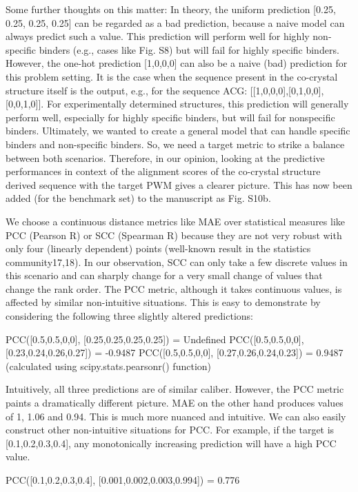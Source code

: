 Some further thoughts on this matter: In theory, the uniform prediction [0.25, 0.25, 0.25, 0.25] can be regarded as a bad prediction, because a naive model can always predict such a value. This prediction will perform well for highly non-specific binders (e.g., cases like Fig. S8) but will fail for highly specific binders. However, the one-hot prediction [1,0,0,0] can also be a naive (bad) prediction for this problem setting. It is the case when the sequence present in the co-crystal structure itself is the output, e.g., for the sequence ACG: [[1,0,0,0],[0,1,0,0],[0,0,1,0]]. For experimentally determined structures, this prediction will generally perform well, especially for highly specific binders, but will fail for nonspecific binders. Ultimately, we wanted to create a general model that can handle specific binders and non-specific binders. So, we need a target metric to strike a balance between both scenarios. Therefore, in our opinion, looking at the predictive performances in context of the alignment scores of the co-crystal structure derived sequence with the target PWM gives a clearer picture. This has now been added (for the benchmark set) to the manuscript as Fig. S10b.

We choose a continuous distance metrics like MAE over statistical measures like PCC (Pearson R) or SCC (Spearman R) because they are not very robust with only four (linearly dependent) points (well-known result in the statistics community17,18). In our observation, SCC can only take a few discrete values in this scenario and can sharply change for a very small change of values that change the rank order. The PCC metric, although it takes continuous values, is affected by similar non-intuitive situations. This is easy to demonstrate by considering the following three slightly altered predictions:

PCC([0.5,0.5,0,0], [0.25,0.25,0.25,0.25]) = Undefined
PCC([0.5,0.5,0,0], [0.23,0.24,0.26,0.27]) = -0.9487
PCC([0.5,0.5,0,0], [0.27,0.26,0.24,0.23]) = 0.9487
(calculated using scipy.stats.pearsonr() function)

Intuitively, all three predictions are of similar caliber. However, the PCC metric paints a dramatically different picture. MAE on the other hand produces values of 1, 1.06 and 0.94. This is much more nuanced and intuitive. We can also easily construct other non-intuitive situations for PCC. For example, if the target is [0.1,0.2,0.3,0.4], any monotonically increasing prediction will have a high PCC value.

PCC([0.1,0.2,0.3,0.4], [0.001,0.002,0.003,0.994]) = 0.776

